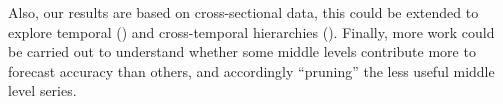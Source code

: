 \documentclass[a4paper,review,12pt,authoryear]{elsarticle}
\begin{document}
Also, our results are based on cross-sectional data, this could be extended to explore temporal (\citealp{athanasopoulosForecastingTemporalHierarchies2017}) and cross-temporal hierarchies (\citealp{girolimettoCrosstemporalProbabilisticForecast2023a}). Finally, more work could be carried out to understand whether some middle levels contribute more to forecast accuracy than others, and accordingly ``pruning'' the less useful middle level series.


\clearpage 
\newpage 





\begingroup
{}


\endgroup
\end{document}
